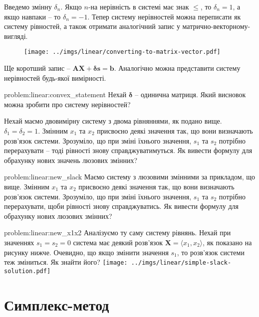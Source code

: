 \documentclass[\main/book.tex]{subfiles}
\begin{document}
Введемо змінну $\delta_n$. Якщо $n$-на нерівність в системі має знак \flqq{}$\leq$\frqq{}, то $\delta_n=1$, а якщо навпаки -- то $\delta_n=-1$. Тепер систему нерівностей можна переписати як систему рівностей, а також отримати аналогічний запис у матрично-векторному-вигляді.

\begin{figure}[!h]
 \center
 \texttt{[image: ../imgs/linear/converting-to-matrix-vector.pdf]}
\end{figure}

Ще коротший запис -- $\mathbf{A} \mathbf{X} + \mathbf{\delta} \mathbf{s} = \mathbf{b}$. Аналогічно можна представити систему нерівностей будь-якої вимірності.

\begin{problem}{problem:linear:convex_statement}
 Нехай $\mathbf{\delta}$ -- одинична матриця. Який висновок можна зробити про систему нерівностей?
\end{problem}

\begin{question}
 Нехай маємо двовимірну систему з двома рівняннями, як подано вище. $\delta_1 = \delta_2 = 1$. Змінним $x_1$ та $x_2$ присвоєно деякі значення так, що вони визначають розв'язок системи. Зрозуміло, що при зміні їхнього значення, $s_1$ та $s_2$ потрібно перерахувати -- тоді рівності знову справджуватимуться. Як вивести формулу для обрахунку нових значень люзових змінних?
\end{question}
\begin{problem}{problem:linear:new_slack}
 Маємо систему з люзовими змінними за прикладом, що вище. Змінним $x_1$ та $x_2$ присвоєно деякі значення так, що вони визначають розв'язок системи. Зрозуміло, що при зміні їхнього значення, $s_1$ та $s_2$ потрібно перерахувати, щоби рівності знову справджуватись. Як вивести формулу для обрахунку нових люзових змінних?
\end{problem}

\begin{problem}{problem:linear:new_x1x2}
 Аналізуємо ту саму систему рівнянь. Нехай при значеннях $s_1 = s_2 = 0$ система має деякий розв'язок $\mathbf{X} = \langle x_1, x_2 \rangle$, як показано на рисунку нижче. Очевидно, що якщо змінити значення $s_1$, то розв'язок системи теж зміниться. Як знайти його?
 \center
 \texttt{[image: ../imgs/linear/simple-slack-solution.pdf]}
\end{problem}

\section{Симплекс-метод}
\label{section:linear:simplex}
\end{document}
